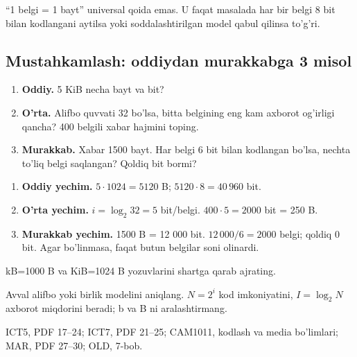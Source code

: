 \documentclass[11pt,a4paper,oneside]{book}
\begin{document}
\begin{warningbox}
``1 belgi = 1 bayt'' universal qoida emas. U faqat masalada har bir belgi 8 bit bilan kodlangani aytilsa yoki soddalashtirilgan model qabul qilinsa to'g'ri.
\end{warningbox}

\subsection{Mustahkamlash: oddiydan murakkabga 3 misol}
\begin{taskbox}
\begin{enumerate}[leftmargin=7mm]
\item \textbf{Oddiy.} 5 KiB necha bayt va bit?
\item \textbf{O'rta.} Alifbo quvvati 32 bo'lsa, bitta belgining eng kam axborot og'irligi qancha? 400 belgili xabar hajmini toping.
\item \textbf{Murakkab.} Xabar 1500 bayt. Har belgi 6 bit bilan kodlangan bo'lsa, nechta to'liq belgi saqlangan? Qoldiq bit bormi?
\end{enumerate}
\end{taskbox}

\begin{solutionbox}
\begin{enumerate}[leftmargin=7mm]
\item \textbf{Oddiy yechim.} $5\cdot1024=5120$ B; $5120\cdot8=40\,960$ bit.
\item \textbf{O'rta yechim.} $i=\log_2 32=5$ bit/belgi. $400\cdot5=2000$ bit = 250 B.
\item \textbf{Murakkab yechim.} 1500 B = 12 000 bit. $12\,000/6=2000$ belgi; qoldiq 0 bit. Agar bo'linmasa, faqat butun belgilar soni olinardi.
\end{enumerate}
\end{solutionbox}
\begin{attest}kB=1000 B va KiB=1024 B yozuvlarini shartga qarab ajrating.\end{attest}

\begin{summarybox}
Avval alifbo yoki birlik modelini aniqlang. $N=2^i$ kod imkoniyatini, $I=\log_2N$ axborot miqdorini beradi; b va B ni aralashtirmang.
\end{summarybox}
\begin{sourcebox}
ICT5, PDF 17--24; ICT7, PDF 21--25; CAM1011, kodlash va media bo'limlari; MAR, PDF 27--30; OLD, 7-bob.
\end{sourcebox}
\end{document}
